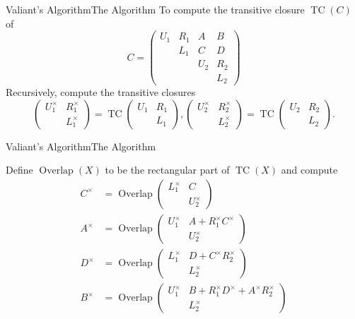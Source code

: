 \documentclass[14pt, notes=hide]{beamer}
\newcommand{\trc}[1]{#1^{\times}}
\DeclareMathOperator{\overlap}{Overlap}
\DeclareMathOperator{\tc}{TC}
\begin{document}
\begin{frame}{Valiant's Algorithm}{The Algorithm} %
To compute the transitive closure $\tc(C)$ of
\begin{equation*}
  C = 
  \begin{pmatrix}
    U_1 & R_1 & A   & B \\
        & L_1 & C   & D \\
        &     & U_2 & R_2 \\
        &     &     & L_2
  \end{pmatrix}
\end{equation*}
\pause
Recursively, compute the transitive closures
\begin{equation*}
  \begin{pmatrix}
    \trc{U_1} & \trc{R_1} \\
          & \trc{L_1}
  \end{pmatrix}
  = \tc
  \begin{pmatrix}
    U_1 & R_1 \\
        & L_1
  \end{pmatrix}, 
   \begin{pmatrix}
    \trc{U_2} & \trc{R_2} \\
          & \trc{L_2}
  \end{pmatrix}
   = \tc
  \begin{pmatrix}
    U_2 & R_2 \\
        & L_2
  \end{pmatrix}.
\end{equation*}
\end{frame} %

\begin{frame}{Valiant's Algorithm}{The Algorithm} %

Define $\overlap(X)$ to be the rectangular part of $\tc(X)$ and compute
\begin{align*}
  \trc{C} &= \overlap
  \begin{pmatrix}
    \trc{L_1} & C \\
        & \trc{U_2}
  \end{pmatrix}
  \\
  \trc{A} &= \overlap
  \begin{pmatrix}
    \trc{U_1} & A + \trc{R_1} \trc{C} \\
        & \trc{U_2}
  \end{pmatrix}
  \\
  \trc{D} &= \overlap
  \begin{pmatrix}
    \trc{L_1} & D + \trc{C} \trc{R_2} \\
        & \trc{L_2}
  \end{pmatrix}
  \\
  \trc{B} &= \overlap
  \begin{pmatrix}
    \trc{U_1} & B + \trc{R_1} \trc{D} + \trc{A} \trc{R_2} \\
        & \trc{L_2}
  \end{pmatrix}
\end{align*}
\pause
\end{frame} %
\end{document}
